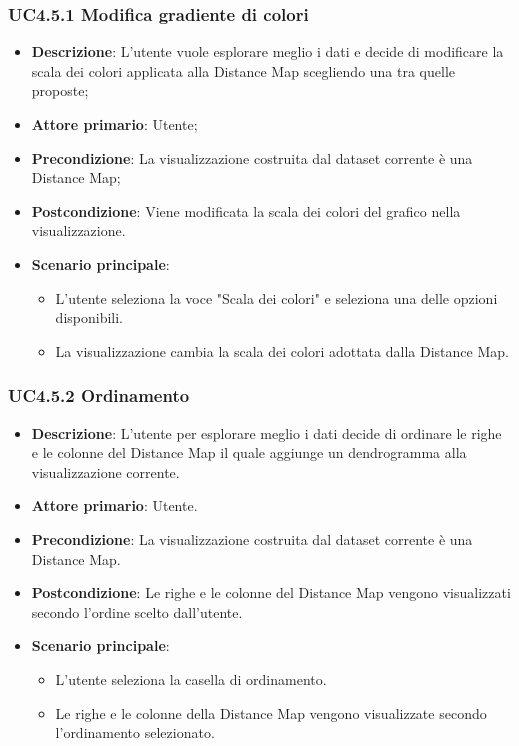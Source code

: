 \subsubsection{UC4.5.1 Modifica gradiente di colori}
\label{ssub:uc4.5.1}
\begin{itemize}
    \item \textbf{Descrizione}: L'utente vuole esplorare meglio i dati e decide di modificare la scala dei colori applicata alla Distance Map scegliendo una tra quelle proposte;
    \item \textbf{Attore primario}: Utente;
    \item \textbf{Precondizione}: La visualizzazione costruita dal dataset corrente è una Distance Map;
    \item \textbf{Postcondizione}: Viene modificata la scala dei colori del grafico nella visualizzazione.
    \item \textbf{Scenario principale}: 
    \begin{itemize}
        \item L'utente seleziona la voce "Scala dei colori" e seleziona una delle opzioni disponibili.
        \item La visualizzazione cambia la scala dei colori adottata dalla Distance Map.
    \end{itemize}
\end{itemize}

\subsubsection{UC4.5.2 Ordinamento}
\label{ssub:uc4.5.2}
\begin{itemize}
    \item \textbf{Descrizione}: L'utente per esplorare meglio i dati decide di ordinare le righe e le colonne del Distance Map il quale aggiunge un dendrogramma alla visualizzazione corrente.
    \item \textbf{Attore primario}: Utente.
    \item \textbf{Precondizione}: La visualizzazione costruita dal dataset corrente è una Distance Map.
    \item \textbf{Postcondizione}: Le righe e le colonne del Distance Map vengono visualizzati secondo l'ordine scelto dall'utente.
    \item \textbf{Scenario principale}: 
    \begin{itemize}
        \item L'utente seleziona la casella di ordinamento.
        \item Le righe e le colonne della Distance Map vengono visualizzate secondo l'ordinamento selezionato.
    \end{itemize}
\end{itemize}


